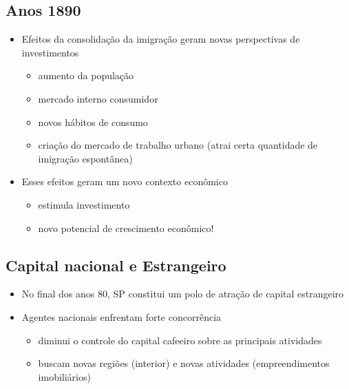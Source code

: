 \documentclass[a4paper,12pt]{article}[abntex2]
\begin{document}
\subsection{\textbf{Anos 1890}}
\begin{itemize}
    \item  Efeitos da consolidação da imigração geram novas perspectivas de investimentos
    \begin{itemize}
        \item  aumento da população
    \end{itemize}
    \begin{itemize}
        \item mercado interno consumidor
    \end{itemize}
    \begin{itemize}
        \item novos hábitos de consumo
    \end{itemize}
    \begin{itemize}
        \item criação do mercado de trabalho urbano (atrai certa quantidade de imigração espontânea)
    \end{itemize}
    \item Esses efeitos geram um novo contexto econômico
    \begin{itemize}
        \item estimula investimento
    \end{itemize}
    \begin{itemize}
        \item novo potencial de crescimento econômico!
    \end{itemize}
\end{itemize}
\subsection{\textbf{Capital nacional e Estrangeiro}}
\begin{itemize}
    \item No final dos anos 80, SP constitui um polo de atração de capital estrangeiro
    \item Agentes nacionais enfrentam forte concorrência
    \begin{itemize}
        \item diminui o controle do capital cafeeiro sobre as principais atividades
    \end{itemize}
    \begin{itemize}
        \item buscam novas regiões (interior) e novas atividades (empreendimentos imobiliários)
    \end{itemize}
\end{itemize}
\end{document}
